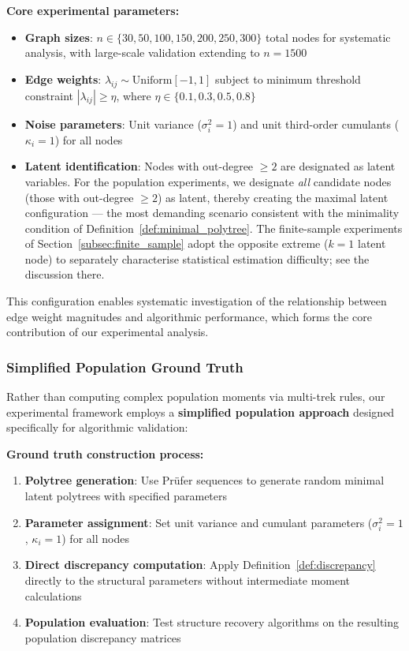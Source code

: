 \documentclass[11pt,a4paper]{article}
\numberwithin{equation}{section}
\begin{document}
\textbf{Core experimental parameters:}
\begin{itemize}
\item \textbf{Graph sizes}: $n \in \{30, 50, 100, 150, 200, 250, 300\}$ total nodes for systematic analysis, with large-scale validation extending to $n = 1500$
\item \textbf{Edge weights}: $\lambda_{ij} \sim \text{Uniform}[-1,1]$ subject to minimum threshold constraint $|\lambda_{ij}| \geq \eta$, where $\eta \in \{0.1, 0.3, 0.5, 0.8\}$
\item \textbf{Noise parameters}: Unit variance ($\sigma_i^2 = 1$) and unit third-order cumulants ($\kappa_i = 1$) for all nodes
\item \textbf{Latent identification}: Nodes with out-degree $\geq 2$ are
designated as latent variables.  For the population experiments, we designate
\emph{all} candidate nodes (those with out-degree $\geq 2$) as latent, thereby
creating the maximal latent configuration --- the most demanding scenario
consistent with the minimality condition of Definition~\ref{def:minimal_polytree}.
The finite-sample experiments of Section~\ref{subsec:finite_sample} adopt
the opposite extreme ($k = 1$ latent node) to separately characterise
statistical estimation difficulty; see the discussion there.
\end{itemize}

This configuration enables systematic investigation of the relationship between edge weight magnitudes and algorithmic performance, which forms the core contribution of our experimental analysis.

\subsubsection{Simplified Population Ground Truth}

Rather than computing complex population moments via multi-trek rules, our experimental framework employs a \textbf{simplified population approach} designed specifically for algorithmic validation:

\textbf{Ground truth construction process:}
\begin{enumerate}[label=(\arabic*)]
\item \textbf{Polytree generation}: Use Prüfer sequences to generate random minimal latent polytrees with specified parameters
\item \textbf{Parameter assignment}: Set unit variance and cumulant parameters ($\sigma_i^2 = 1$, $\kappa_i = 1$) for all nodes
\item \textbf{Direct discrepancy computation}: Apply Definition~\ref{def:discrepancy} directly to the structural parameters without intermediate moment calculations
\item \textbf{Population evaluation}: Test structure recovery algorithms on the resulting population discrepancy matrices
\end{enumerate}
\end{document}
